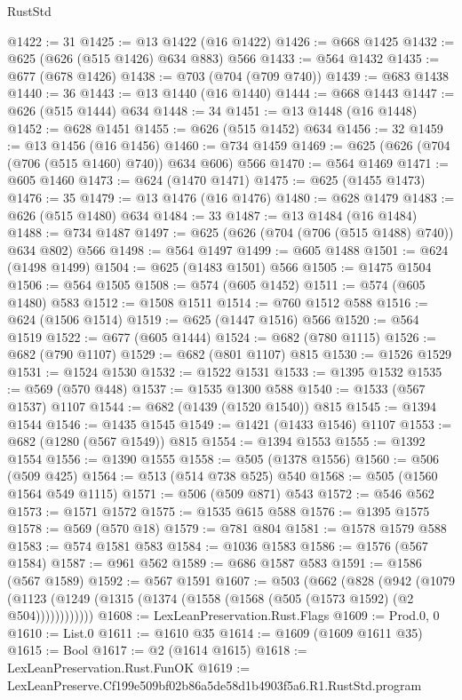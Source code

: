 \begin{lexlean}{RustStd}
\begin{coremodule}
@1422 := 31
@1425 := @13 @1422 (@16 @1422)
@1426 := @668 @1425
@1432 := @625 (@626 (@515 @1426) @634 @883) @566
@1433 := @564 @1432
@1435 := @677 (@678 @1426)
@1438 := @703 (@704 (@709 @740))
@1439 := @683 @1438
@1440 := 36
@1443 := @13 @1440 (@16 @1440)
@1444 := @668 @1443
@1447 := @626 (@515 @1444) @634
@1448 := 34
@1451 := @13 @1448 (@16 @1448)
@1452 := @628 @1451
@1455 := @626 (@515 @1452) @634
@1456 := 32
@1459 := @13 @1456 (@16 @1456)
@1460 := @734 @1459
@1469 := @625 (@626 (@704 (@706 (@515 @1460) @740)) @634 @606) @566
@1470 := @564 @1469
@1471 := @605 @1460
@1473 := @624 (@1470 @1471)
@1475 := @625 (@1455 @1473)
@1476 := 35
@1479 := @13 @1476 (@16 @1476)
@1480 := @628 @1479
@1483 := @626 (@515 @1480) @634
@1484 := 33
@1487 := @13 @1484 (@16 @1484)
@1488 := @734 @1487
@1497 := @625 (@626 (@704 (@706 (@515 @1488) @740)) @634 @802) @566
@1498 := @564 @1497
@1499 := @605 @1488
@1501 := @624 (@1498 @1499)
@1504 := @625 (@1483 @1501) @566
@1505 := @1475 @1504
@1506 := @564 @1505
@1508 := @574 (@605 @1452)
@1511 := @574 (@605 @1480) @583
@1512 := @1508 @1511
@1514 := @760 @1512 @588
@1516 := @624 (@1506 @1514)
@1519 := @625 (@1447 @1516) @566
@1520 := @564 @1519
@1522 := @677 (@605 @1444)
@1524 := @682 (@780 @1115)
@1526 := @682 (@790 @1107)
@1529 := @682 (@801 @1107) @815
@1530 := @1526 @1529
@1531 := @1524 @1530
@1532 := @1522 @1531
@1533 := @1395 @1532
@1535 := @569 (@570 @448)
@1537 := @1535 @1300 @588
@1540 := @1533 (@567 @1537) @1107
@1544 := @682 (@1439 (@1520 @1540)) @815
@1545 := @1394 @1544
@1546 := @1435 @1545
@1549 := @1421 (@1433 @1546) @1107
@1553 := @682 (@1280 (@567 @1549)) @815
@1554 := @1394 @1553
@1555 := @1392 @1554
@1556 := @1390 @1555
@1558 := @505 (@1378 @1556)
@1560 := @506 (@509 @425)
@1564 := @513 (@514 @738 @525) @540
@1568 := @505 (@1560 @1564 @549 @1115)
@1571 := @506 (@509 @871) @543
@1572 := @546 @562
@1573 := @1571 @1572
@1575 := @1535 @615 @588
@1576 := @1395 @1575
@1578 := @569 (@570 @18)
@1579 := @781 @804
@1581 := @1578 @1579 @588
@1583 := @574 @1581 @583
@1584 := @1036 @1583
@1586 := @1576 (@567 @1584)
@1587 := @961 @562
@1589 := @686 @1587 @583
@1591 := @1586 (@567 @1589)
@1592 := @567 @1591
@1607 := @503
    (@662
      (@828
        (@942
          (@1079 (@1123 (@1249 (@1315 (@1374 (@1558 (@1568 (@505 (@1573 @1592) (@2 @504))))))))))))
@1608 := LexLeanPreservation.Rust.Flags
@1609 := Prod.{0, 0}
@1610 := List.{0}
@1611 := @1610 @35
@1614 := @1609 (@1609 @1611 @35)
@1615 := Bool
@1617 := @2 (@1614 @1615)
@1618 := LexLeanPreservation.Rust.FunOK
@1619 := LexLeanPreserve.Cf199e509bf02b86a5de58d1b4903f5a6.R1.RustStd.program

\end{coremodule}
\end{lexlean}
